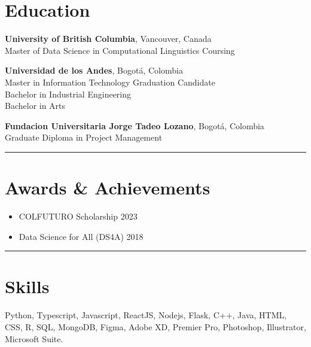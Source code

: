 \documentclass[10pt,a4paper]{article}
\begin{document}
\section*{Education}

\textbf{University of British Columbia}, Vancouver, Canada \\
Master of Data Science in Computational Linguistics \hfill Coursing

\textbf{Universidad de los Andes}, Bogotá, Colombia \\
Master in Information Technology \hfill Graduation Candidate \\
Bachelor in Industrial Engineering \\
Bachelor in Arts

\textbf{Fundacion Universitaria Jorge Tadeo Lozano}, Bogotá, Colombia \\
Graduate Diploma in Project Management\\
\rule{\textwidth}{0.4pt} 

\section*{Awards \& Achievements}

\begin{itemize}[noitemsep]
    \item COLFUTURO Scholarship \hfill 2023
    \item Data Science for All (DS4A)  \hfill 2018
\end{itemize}

\rule{\textwidth}{0.4pt} 
\section*{Skills}

Python, Typescript, Javascript, ReactJS, Nodejs, Flask, C++, Java, HTML, CSS, R, SQL, MongoDB, Figma, Adobe XD, Premier Pro, Photoshop, Illustrator, Microsoft Suite.
\end{document}
